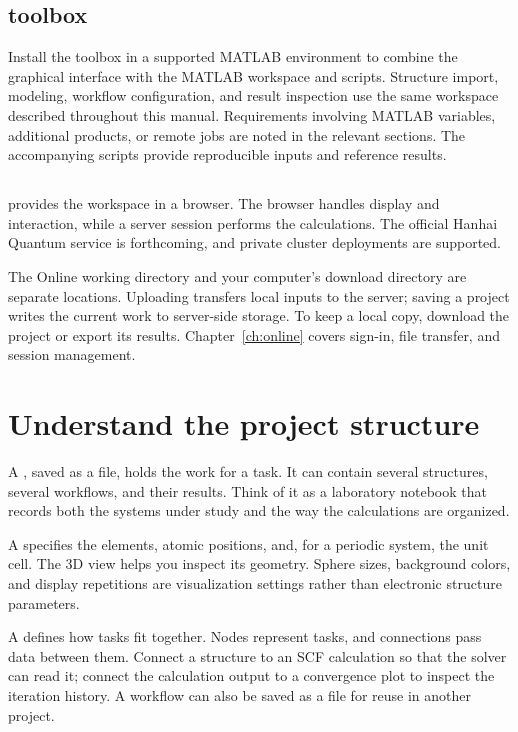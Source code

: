\subsection{\regmark{} toolbox}
Install the toolbox in a supported MATLAB\regmark{} environment to combine the graphical interface with the MATLAB\regmark{} workspace and scripts. Structure import, modeling, workflow configuration, and result inspection use the same workspace described throughout this manual. Requirements involving MATLAB\regmark{} variables, additional products, or remote jobs are noted in the relevant sections. The accompanying scripts provide reproducible inputs and reference results.

\subsection{\headinglatin{\ksonline}}
\ksonline{} provides the workspace in a browser. The browser handles display and interaction, while a server session performs the calculations. The official Hanhai Quantum\regmark{} service is forthcoming, and private cluster deployments are supported.

The Online working directory and your computer's download directory are separate locations. Uploading transfers local inputs to the server; saving a project writes the current work to server-side storage. To keep a local copy, download the project or export its results. Chapter~\ref{ch:online} covers sign-in, file transfer, and session management.

\section{Understand the project structure}
A , saved as a  file, holds the work for a task. It can contain several structures, several workflows, and their results. Think of it as a laboratory notebook that records both the systems under study and the way the calculations are organized.

A  specifies the elements, atomic positions, and, for a periodic system, the unit cell. The 3D view helps you inspect its geometry. Sphere sizes, background colors, and display repetitions are visualization settings rather than electronic structure parameters.

A  defines how tasks fit together. Nodes represent tasks, and connections pass data between them. Connect a structure to an SCF calculation so that the solver can read it; connect the calculation output to a convergence plot to inspect the iteration history. A workflow can also be saved as a  file for reuse in another project.

